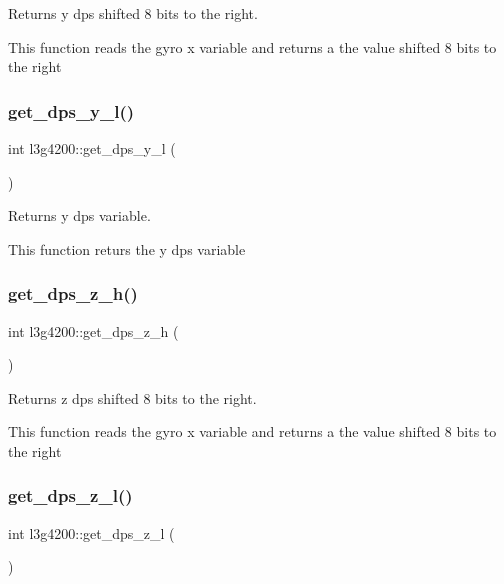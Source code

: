 Returns y dps shifted 8 bits to the right. 

This function reads the gyro x variable and returns a the value shifted 8 bits to the right \mbox{\label{classl3g4200_adcd400fc92347bad573f020b151e9fb5}} 
\subsubsection{\texorpdfstring{get\+\_\+dps\+\_\+y\+\_\+l()}{get\_dps\_y\_l()}}
{\footnotesize\ttfamily int l3g4200\+::get\+\_\+dps\+\_\+y\+\_\+l (\begin{DoxyParamCaption}{ }\end{DoxyParamCaption})\hspace{0.3cm}{\ttfamily [inline]}}



Returns y dps variable. 

This function returs the y dps variable \mbox{\label{classl3g4200_ac2b63c3b1af1862adbbe96d4166b3e38}} 
\subsubsection{\texorpdfstring{get\+\_\+dps\+\_\+z\+\_\+h()}{get\_dps\_z\_h()}}
{\footnotesize\ttfamily int l3g4200\+::get\+\_\+dps\+\_\+z\+\_\+h (\begin{DoxyParamCaption}{ }\end{DoxyParamCaption})\hspace{0.3cm}{\ttfamily [inline]}}



Returns z dps shifted 8 bits to the right. 

This function reads the gyro x variable and returns a the value shifted 8 bits to the right \mbox{\label{classl3g4200_a3ff13048a18eed7c7f03ae50a3bc68bf}} 
\subsubsection{\texorpdfstring{get\+\_\+dps\+\_\+z\+\_\+l()}{get\_dps\_z\_l()}}
{\footnotesize\ttfamily int l3g4200\+::get\+\_\+dps\+\_\+z\+\_\+l (\begin{DoxyParamCaption}{ }\end{DoxyParamCaption})\hspace{0.3cm}{\ttfamily [inline]}}



